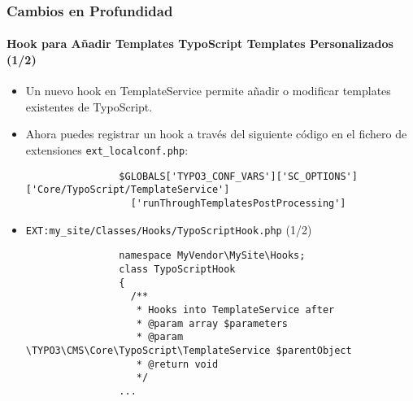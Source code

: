\begin{frame}[fragile]
	\frametitle{Cambios en Profundidad}
	\framesubtitle{Hook para Añadir Templates TypoScript Templates Personalizados (1/2)}

	\lstset{basicstyle=\tiny\ttfamily}

	\begin{itemize}
		\item Un nuevo hook en TemplateService permite añadir o modificar templates existentes de TypoScript.

		\item Ahora puedes registrar un hook a través del siguiente código en el fichero de extensiones \texttt{ext\_localconf.php}:

			\begin{lstlisting}
				$GLOBALS['TYPO3_CONF_VARS']['SC_OPTIONS']['Core/TypoScript/TemplateService']
				  ['runThroughTemplatesPostProcessing']
			\end{lstlisting}

		\item \texttt{EXT:my\_site/Classes/Hooks/TypoScriptHook.php} (1/2)

			\begin{lstlisting}
				namespace MyVendor\MySite\Hooks;
				class TypoScriptHook
				{
				  /**
				   * Hooks into TemplateService after
				   * @param array $parameters
				   * @param \TYPO3\CMS\Core\TypoScript\TemplateService $parentObject
				   * @return void
				   */
				...
			\end{lstlisting}

	\end{itemize}

\end{frame}


